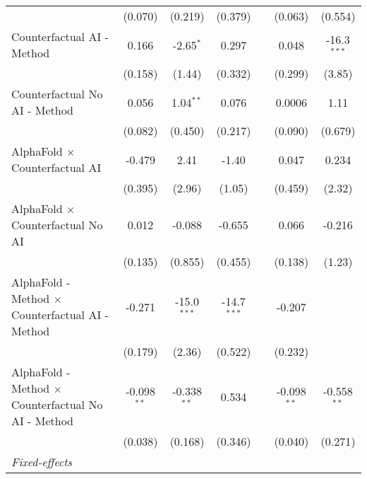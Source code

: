 \begin{tabular}{lcccccc}
                                                              & (0.070)       & (0.219)       & (0.379)       &                & (0.063)        & (0.554)\\   
   Counterfactual AI - Method                                 & 0.166         & -2.65$^{*}$   & 0.297         &                & 0.048          & -16.3$^{***}$\\   
                                                              & (0.158)       & (1.44)        & (0.332)       &                & (0.299)        & (3.85)\\   
   Counterfactual No AI - Method                              & 0.056         & 1.04$^{**}$   & 0.076         &                & 0.0006         & 1.11\\   
                                                              & (0.082)       & (0.450)       & (0.217)       &                & (0.090)        & (0.679)\\   
   AlphaFold $\times$ Counterfactual AI                       & -0.479        & 2.41          & -1.40         &                & 0.047          & 0.234\\   
                                                              & (0.395)       & (2.96)        & (1.05)        &                & (0.459)        & (2.32)\\   
   AlphaFold $\times$ Counterfactual No AI                    & 0.012         & -0.088        & -0.655        &                & 0.066          & -0.216\\   
                                                              & (0.135)       & (0.855)       & (0.455)       &                & (0.138)        & (1.23)\\   
   AlphaFold - Method $\times$ Counterfactual AI - Method     & -0.271        & -15.0$^{***}$ & -14.7$^{***}$ &                & -0.207         &   \\   
                                                              & (0.179)       & (2.36)        & (0.522)       &                & (0.232)        &   \\   
   AlphaFold - Method $\times$ Counterfactual No AI - Method  & -0.098$^{**}$ & -0.338$^{**}$ & 0.534         &                & -0.098$^{**}$  & -0.558$^{**}$\\   
                                                              & (0.038)       & (0.168)       & (0.346)       &                & (0.040)        & (0.271)\\   
   \midrule
   \emph{Fixed-effects}\\

\end{tabular}
